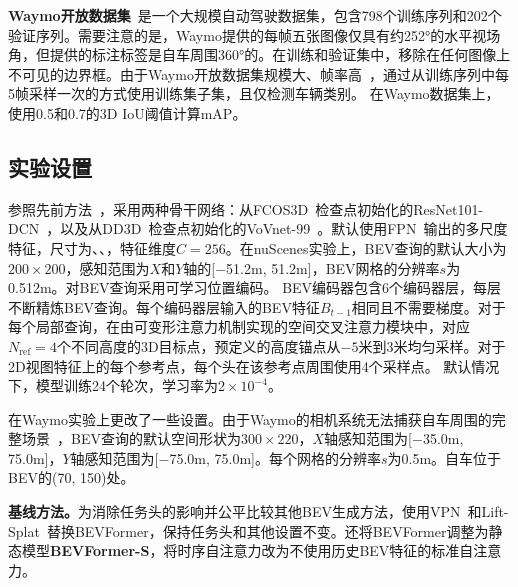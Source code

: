 \documentclass{article}
\begin{document}
\noindent\textbf{Waymo开放数据集}~\cite{sun2020scalability}是一个大规模自动驾驶数据集，包含798个训练序列和202个验证序列。需要注意的是，Waymo提供的每帧五张图像仅具有约252°的水平视场角，但提供的标注标签是自车周围360°的。在训练和验证集中，移除在任何图像上不可见的边界框。由于Waymo开放数据集规模大、帧率高~\cite{reading2021categorical}，通过从训练序列中每5帧采样一次的方式使用训练集子集，且仅检测车辆类别。
在Waymo数据集上，使用0.5和0.7的3D IoU阈值计算mAP。 

\subsection{实验设置}\label{details}
参照先前方法~\cite{wang2021fcos3d,wang2022detr3d,park2021pseudo}，采用两种骨干网络：从FCOS3D~\cite{wang2021fcos3d}检查点初始化的ResNet101-DCN~\cite{he2016deep,dai2017deformable}，以及从DD3D~\cite{park2021pseudo}检查点初始化的VoVnet-99~\cite{lee2019energy}。默认使用FPN~\cite{Lin2017FeaturePN}输出的多尺度特征，尺寸为、、，特征维度$C\!=\!256$。在nuScenes实验上，BEV查询的默认大小为$200\!\times\!200$，感知范围为$X$和$Y$轴的[$-$51.2m, 51.2m]，BEV网格的分辨率$s$为0.512m。对BEV查询采用可学习位置编码。
BEV编码器包含6个编码器层，每层不断精炼BEV查询。每个编码器层输入的BEV特征$B_{t\!-\!1}$相同且不需要梯度。对于每个局部查询，在由可变形注意力机制实现的空间交叉注意力模块中，对应${N_\text{ref}}\!=\!4$个不同高度的3D目标点，预定义的高度锚点从$-5$米到3米均匀采样。对于2D视图特征上的每个参考点，每个头在该参考点周围使用4个采样点。
默认情况下，模型训练24个轮次，学习率为$2\!\times\!10^{-4}$。

在Waymo实验上更改了一些设置。由于Waymo的相机系统无法捕获自车周围的完整场景~\cite{sun2020scalability}，BEV查询的默认空间形状为$300\!\times\!220$，$X$轴感知范围为[$-$35.0m, 75.0m]，$Y$轴感知范围为[$-$75.0m, 75.0m]。每个网格的分辨率$s$为0.5m。自车位于BEV的(70, 150)处。

\noindent\textbf{基线方法。}为消除任务头的影响并公平比较其他BEV生成方法，使用VPN~\cite{pan2020cross}和Lift-Splat~\cite{philion2020lift}替换BEVFormer，保持任务头和其他设置不变。还将BEVFormer调整为静态模型\textbf{BEVFormer-S}，将时序自注意力改为不使用历史BEV特征的标准自注意力。
\end{document}
